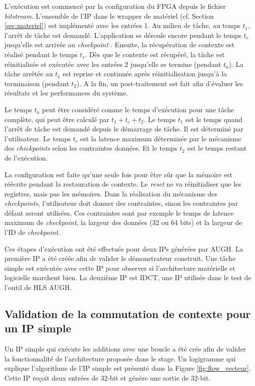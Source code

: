 L'exécution est commencé par la configuration du FPGA depuis le fichier \emph{bitstream}. L'ensemble de l'IP
dans le wrapper de matériel (cf. Section \ref{sec:materiel}) est implémenté avec les entrées 1.
Au milieu de tâche, au temps $t_1$, l'arrêt de tâche est demandé. L'application se déroule encore
pendant le temps $t_c$ jusqu'elle est arrivée
au \emph{checkpoint} . Ensuite, la récupération de contexte est réalisé pendant le temps
$t_s$. Dès que le contexte est récupéré, la tâche est réinitialisée et exécutée avec les entrées 2 jusqu'elle se termine (pendant $t_a$).
La tâche arrêtée au $t_1$ est reprise et continuée après réinitialisation jusqu'à la terminaison (pendant $t_2$). 
A la fin, un post-traitement est fait afin d'évaluer les résultats et les performances du système.

Le temps $t_a$ peut être considéré comme le temps d'exécution pour une tâche complète,
qui peut être calculé par $t_1 + t_c + t_2$. Le temps $t_1$ est le temps quand l'arrêt de tâche est demandé
depuis le démarrage de tâche. Il est déterminé par l'utilisateur. Le temps $t_c$ est la latence maximum déterminée
par le mécanisme des \emph{checkpoints} selon les contraintes données. Et le temps $t_2$ est
le temps restant de l'exécution.

La configuration est faite qu'une seule fois pour être sûr que la mémoire est réécrite pendant la restauration
de contexte. Le \emph{reset} ne va réinitialiser que les registres, mais pas les mémoires.
Dans la réalisation du mécanisme des \emph{checkpoints}, l'utilisateur doit donner des contraintes,
sinon les contraintes par défaut seront utilisées. Ces contraintes sont par exemple le temps de latence maximum de \emph{checkpoint},
la largeur des données (32 ou 64 bits) et la largeur de l'ID de \emph{checkpoint}.

Ces étapes d'exécution ont été effectués pour deux IPs générées par AUGH. La première IP a été créée
afin de valider le démonstrateur construit. Une tâche simple est exécutée avec cette IP pour observer
si l'architecture matérielle et logicielle marchent bien. La deuxième IP est IDCT, une IP utilisée
dans le test de l'outil de HLS AUGH.

\subsection{Validation de la commutation de contexte pour un IP simple}

Un IP simple qui exécute les additions avec une boucle a été crée afin de valider la fonctionnalité de 
l'architecture proposée dans le stage. Un logigramme qui explique l'algorithme de l'IP simple est présenté dans la Figure
\ref{fig:flow_vecteur}. Cette IP reçoit deux entrées de 32-bit et génère une sortie de 32-bit.

